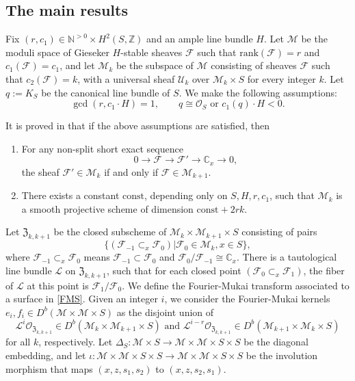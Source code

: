 \documentclass{amsart}
\numberwithin{equation}{section}
\newcommand\mc{\mathcal}
\newcommand\mf{\mathfrak}
\newcommand\mb{\mathbb}
\newcommand{\rank}{\mathrm{rank}}
\theoremstyle{definition}
\theoremstyle{remark}
\begin{document}
\subsection{The main results}
  \label{sec:1.2}
 Fix $(r,c_{1})\in \mb{N}^{>0}\times H^{2}(S,\mb{Z})$ and an ample line bundle $H$. Let $\mc{M}$ be the moduli space of Gieseker $H$-stable sheaves $\mc{F}$ such that $\rank(\mc{F})=r$ and $c_{1}(\mc{F})=c_{1}$, and let $\mc{M}_{k}$ be the subspace of $\mc{M}$ consisting of sheaves $\mc{F}$ such that $c_{2}(\mc{F})=k$, with a universal sheaf $\mc{U}_{k}$ over $\mc{M}_{k}\times S$ for every integer $k$.  Let $q:=K_{S}$ be the canonical line bundle of $S$. We make the following assumptions:
\begin{equation*}
  \gcd(r, c_{1}\cdot H) = 1,  \qquad  q \cong \mc{O}_S \text{ or } c_1(q) \cdot H < 0.
\end{equation*}
 
 It is proved in \cite{negut2017shuffle, neguct2018hecke} that if the above assumptions are satisfied, then
\begin{enumerate}[leftmargin=*]
\item  For any non-split short exact sequence
  $$0\to \mc{F}\to \mc{F}' \to \mb{C}_{x}\to 0,$$
  the sheaf $\mc{F}'\in \mc{M}_{k}$ if and only if $\mc{F}\in \mc{M}_{k+1}$.
\item There exists a constant $\mathrm{const}$, depending only on $S,H,r,c_{1}$, such that $\mc{M}_{k}$ is a smooth projective scheme of dimension $\mathrm{const}+2rk$.
\end{enumerate}



Let $\mf{Z}_{k,k+1}$ be the closed subscheme of $\mc{M}_{k}\times \mc{M}_{k+1}\times S$ consisting of pairs
\begin{equation}
  \label{e11}
  \{(\mc{F}_{-1}\subset_{x} \mc{F}_{0})|\mc{F}_{0}\in \mc{M}_{k}, x\in S\},
\end{equation}
where $\mc{F}_{-1}\subset_{x}\mc{F}_{0}$ means $\mc{F}_{-1}\subset \mc{F}_{0}$ and $\mc{F}_{0}/\mc{F}_{-1}\cong \mb{C}_{x}$. There is a tautological line bundle $\mc{L}$ on $\mf{Z}_{k,k+1}$, such that for each closed point $(\mc{F}_{0}\subset_{x} \mc{F}_{1})$, the fiber of $\mc{L}$ at this point is $\mc{F}_{1}/\mc{F}_{0}$. We define the Fourier-Mukai transform associated to a surface in \cref{FMS}. Given an integer $i$, we consider the Fourier-Mukai kernels $e_{i},f_{i}\in D^{b}(\mc{M}\times \mc{M}\times S)$ as the disjoint union of
\begin{equation*}
  \mc{L}^{i}\mc{O}_{\mf{Z}_{k,k+1}}\in D^{b}(\mc{M}_{k}\times \mc{M}_{k+1}\times S) \text{ and }  \mc{L}^{i-r}\mc{O}_{\mf{Z}_{k,k+1}}\in D^{b}(\mc{M}_{k+1}\times \mc{M}_{k}\times S)
\end{equation*}
 for all $k$, respectively. Let $\Delta_{S}:\mc{M}\times S\to \mc{M}\times \mc{M}\times S\times S$ be the diagonal embedding, and let $\iota:\mc{M}\times \mc{M}\times S\times S\to \mc{M}\times \mc{M}\times S\times S$ be the involution morphism that maps $(x,z,s_{1},s_{2})$ to $(x,z,s_{2},s_{1})$.
\end{document}
